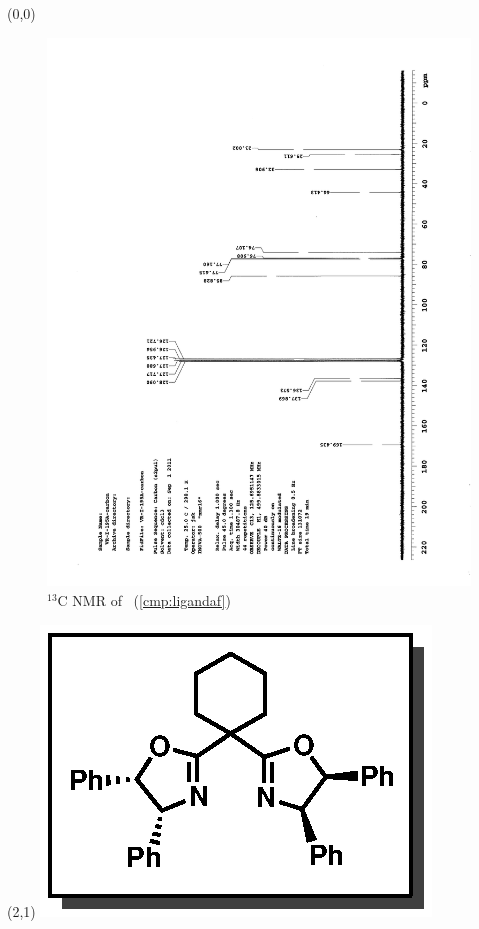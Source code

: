 \clearpage
\begin{textblock}{20}(0,0)
\begin{figure}[htb]
\caption{$^{13}$C NMR of  \CMPligandaf\ (\ref{cmp:ligandaf})}
\includegraphics[scale=0.75, trim = 0mm 0mm 0mm 5mm,
clip]{chp_asymmetric/images/nmr/ligandafC}
\vspace{-100pt}
\end{figure}
\end{textblock}
\begin{textblock}{1}(2,1)
\includegraphics[scale=0.8, angle=90]{chp_asymmetric/images/ligandaf}
\end{textblock}
\clearpage

